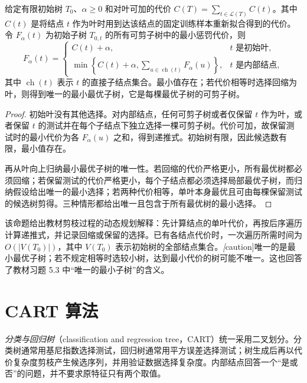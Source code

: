 \begin{proposition}[固定初始树的最优剪枝]
\label{prop:lihang-tree-pruning-dp}
给定有限初始树 $T_0$、$\alpha\geq0$ 和对叶可加的代价 $C(T)=\sum_{t\in\mathcal L(T)}C(t)$。其中 $C(t)$ 是将结点 $t$ 作为叶时用到达该结点的固定训练样本重新拟合得到的代价。令 $F_\alpha(t)$ 为初始子树 $T_{0,t}$ 的所有可剪子树中的最小惩罚代价，则
\begin{equation}
  F_\alpha(t)=
  \begin{cases}
    C(t)+\alpha,&t\text{ 是初始叶},\\
    \displaystyle\min\left\{C(t)+\alpha,
      \sum_{u\in\operatorname{ch}(t)}F_\alpha(u)\right\},&t\text{ 是内部结点},
  \end{cases}
  \label{eq:lihang-tree-pruning-dp}
\end{equation}
其中 $\operatorname{ch}(t)$ 表示 $t$ 的直接子结点集合。最小值存在；若代价相等时选择回缩为叶，则得到唯一的最小最优子树，它是每棵最优子树的可剪子树。
\end{proposition}
\begin{proof}
初始叶没有其他选择。对内部结点，任何可剪子树或者仅保留 $t$ 作为叶，或者保留 $t$ 的测试并在每个子结点下独立选择一棵可剪子树。代价可加，故保留测试时的最小代价为各 $F_\alpha(u)$ 之和，得到递推式。初始树有限，因此候选数有限，最小值存在。

再从叶向上归纳最小最优子树的唯一性。若回缩的代价严格更小，所有最优树都必须回缩；若保留测试的代价严格更小，每个子结点都必须选择局部最优子树，而归纳假设给出唯一的最小选择；若两种代价相等，单叶本身最优且可由每棵保留测试的候选树剪得。三种情形都给出唯一且包含于所有最优树的最小选择。\qedhere
\end{proof}

该命题给出教材剪枝过程的动态规划解释：先计算结点的单叶代价，再按后序遍历计算递推式，并记录回缩或保留的选择。已有各结点代价时，一次遍历所需时间为 $O(|V(T_0)|)$，其中 $V(T_0)$ 表示初始树的全部结点集合。\emph[caution]{唯一的是最小最优子树；若不规定相等时选较小树，达到最小代价的树可能不唯一。}这也回答了教材习题 5.3 中“唯一的最小子树”的含义。

\section{CART 算法}
\label{sec:lihang-cart}

\emph{分类与回归树}（classification and regression tree，CART）统一采用二叉划分。分类树通常用基尼指数选择测试，回归树通常用平方误差选择测试；树生成后再以代价复杂度剪枝产生候选序列，并用验证数据选择复杂度。内部结点回答一个“是或否”的问题，并不要求原特征只有两个取值。

